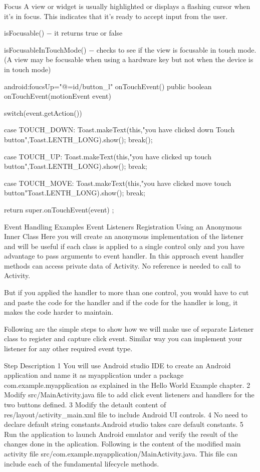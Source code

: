 \documentclass{fisatproject}
\begin{document}
Focus
A view or widget is usually highlighted or displays a flashing cursor when it’s in focus. This indicates that it’s ready to accept input from the user.

isFocusable() − it returns true or false

isFocusableInTouchMode() − checks to see if the view is focusable in touch mode. (A view may be focusable when using a hardware key but not when the device is in touch mode)

android:foucsUp="@=id/button_l"
onTouchEvent()
public boolean onTouchEvent(motionEvent event){
   switch(event.getAction()){
      case TOUCH_DOWN:
      Toast.makeText(this,"you have clicked down Touch button",Toast.LENTH_LONG).show();
      break();
   
      case TOUCH_UP:
      Toast.makeText(this,"you have clicked up touch button",Toast.LENTH_LONG).show();
      break;
   
      case TOUCH_MOVE:
      Toast.makeText(this,"you have clicked move touch button"Toast.LENTH_LONG).show();
      break;
   }
   return super.onTouchEvent(event) ;
}
Event Handling Examples
Event Listeners Registration Using an Anonymous Inner Class
Here you will create an anonymous implementation of the listener and will be useful if each class is applied to a single control only and you have advantage to pass arguments to event handler. In this approach event handler methods can access private data of Activity. No reference is needed to call to Activity.

But if you applied the handler to more than one control, you would have to cut and paste the code for the handler and if the code for the handler is long, it makes the code harder to maintain.

Following are the simple steps to show how we will make use of separate Listener class to register and capture click event. Similar way you can implement your listener for any other required event type.

Step	Description
1	You will use Android studio IDE to create an Android application and name it as myapplication under a package com.example.myapplication as explained in the Hello World Example chapter.
2	Modify src/MainActivity.java file to add click event listeners and handlers for the two buttons defined.
3	Modify the detault content of res/layout/activity_main.xml file to include Android UI controls.
4	No need to declare default string constants.Android studio takes care default constants.
5	Run the application to launch Android emulator and verify the result of the changes done in the aplication.
Following is the content of the modified main activity file src/com.example.myapplication/MainActivity.java. This file can include each of the fundamental lifecycle methods.
\end{document}
